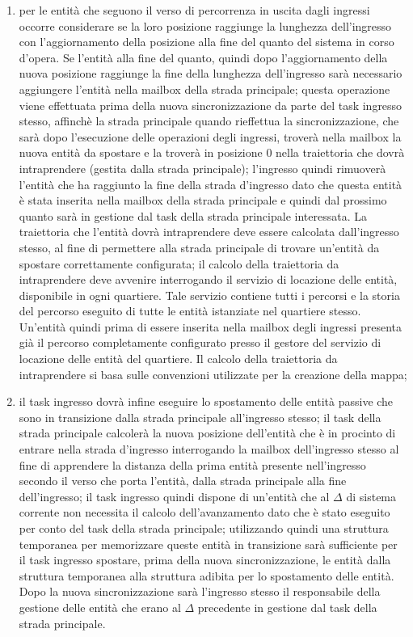 \begin{enumerate}
\item per le entità che seguono il verso di percorrenza in uscita dagli ingressi occorre considerare se la loro posizione raggiunge la lunghezza dell'ingresso con l'aggiornamento della posizione alla fine del quanto del sistema in corso d'opera. Se l'entità alla fine del quanto, quindi dopo l'aggiornamento della nuova posizione raggiunge la fine della lunghezza dell'ingresso sarà necessario aggiungere l'entità nella mailbox della strada principale; questa operazione viene effettuata prima della nuova sincronizzazione da parte del task ingresso stesso, affinchè la strada principale quando rieffettua la sincronizzazione, che sarà dopo l'esecuzione delle operazioni degli ingressi, troverà nella mailbox la nuova entità da spostare e la troverà in posizione 0 nella traiettoria che dovrà intraprendere (gestita dalla strada principale); l'ingresso quindi rimuoverà l'entità che ha raggiunto la fine della strada d'ingresso dato che questa entità è stata inserita nella mailbox della strada principale e quindi dal prossimo quanto sarà in gestione dal task della strada principale interessata. La traiettoria che l'entità dovrà intraprendere deve essere calcolata dall'ingresso stesso, al fine di permettere alla strada principale di trovare un'entità da spostare correttamente configurata; il calcolo della traiettoria da intraprendere deve avvenire interrogando il servizio di locazione delle entità, disponibile in ogni quartiere. Tale servizio contiene tutti i percorsi e la storia del percorso eseguito di tutte le entità istanziate nel quartiere stesso. Un'entità quindi prima di essere inserita nella mailbox degli ingressi presenta già il percorso completamente configurato presso il gestore del servizio di locazione delle entità del quartiere. Il calcolo della traiettoria da intraprendere si basa sulle convenzioni utilizzate per la creazione della mappa;
\item il task ingresso dovrà infine eseguire lo spostamento delle entità passive che sono in transizione dalla strada principale all'ingresso stesso; il task della strada principale calcolerà la nuova posizione dell'entità che è in procinto di entrare nella strada d'ingresso interrogando la mailbox dell'ingresso stesso al fine di apprendere la distanza della prima entità presente nell'ingresso secondo il verso che porta l'entità, dalla strada principale alla fine dell'ingresso; il task ingresso quindi dispone di un'entità che al $\Delta$ di sistema corrente non necessita il calcolo dell'avanzamento dato che è stato eseguito per conto del task della strada principale; utilizzando quindi una struttura temporanea per memorizzare queste entità in transizione sarà sufficiente per il task ingresso spostare, prima della nuova sincronizzazione, le entità dalla struttura temporanea alla struttura adibita per lo spostamento delle entità. Dopo la nuova sincronizzazione sarà l'ingresso stesso il responsabile della gestione delle entità che erano al $\Delta$ precedente in gestione dal task della strada principale.
\end{enumerate}
